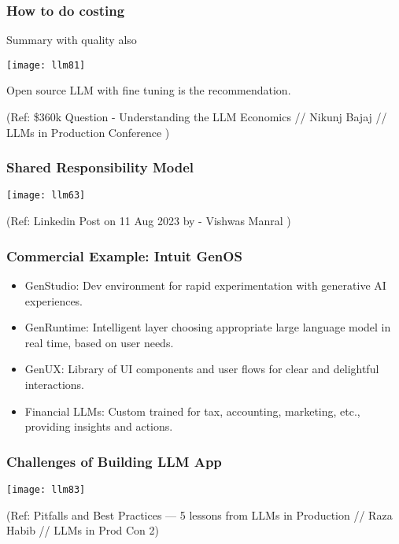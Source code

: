 \begin{frame}[fragile]\frametitle{How to do costing}

Summary with quality also

\begin{center}
\texttt{[image: llm81]}
\end{center}		

Open source LLM with fine tuning is the recommendation.


{\tiny (Ref: \$360k Question - Understanding the LLM Economics // Nikunj Bajaj // LLMs in Production Conference )}

\end{frame}




\begin{frame}[fragile]\frametitle{Shared Responsibility Model}

\begin{center}
\texttt{[image: llm63]}
\end{center}		


{\tiny (Ref: Linkedin Post on 11 Aug 2023 by - Vishwas Manral )}

\end{frame}


\begin{frame}[fragile]\frametitle{Commercial Example: Intuit GenOS}

\begin{itemize}
    \item GenStudio: Dev environment for rapid experimentation with generative AI experiences.
    \item GenRuntime: Intelligent layer choosing appropriate large language model in real time, based on user needs.
    \item GenUX: Library of UI components and user flows for clear and delightful interactions.
    \item Financial LLMs: Custom trained for tax, accounting, marketing, etc., providing insights and actions.
\end{itemize}

\end{frame}

\begin{frame}[fragile]\frametitle{Challenges of Building LLM App}


\begin{center}
\texttt{[image: llm83]}

\end{center}

{\tiny (Ref: Pitfalls and Best Practices — 5 lessons from LLMs in Production // Raza Habib // LLMs in Prod Con 2)}
\end{frame}


